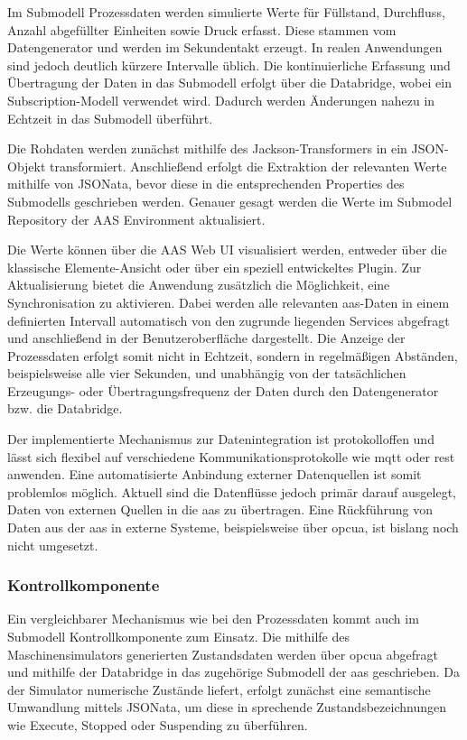 Im Submodell Prozessdaten werden simulierte Werte für Füllstand, Durchfluss, Anzahl abgefüllter Einheiten sowie Druck erfasst.
Diese stammen vom Datengenerator und werden im Sekundentakt erzeugt.
In realen Anwendungen sind jedoch deutlich kürzere Intervalle üblich.
Die kontinuierliche Erfassung und Übertragung der Daten in das Submodell erfolgt über die Databridge, wobei ein Subscription-Modell verwendet wird.
Dadurch werden Änderungen nahezu in Echtzeit in das Submodell überführt.

Die Rohdaten werden zunächst mithilfe des Jackson-Transformers in ein JSON-Objekt transformiert.
Anschließend erfolgt die Extraktion der relevanten Werte mithilfe von JSONata, bevor diese in die entsprechenden Properties des Submodells geschrieben werden.
Genauer gesagt werden die Werte im Submodel Repository der AAS Environment aktualisiert.

Die Werte können über die AAS Web UI visualisiert werden, entweder über die klassische Elemente-Ansicht oder über ein speziell entwickeltes Plugin.
Zur Aktualisierung bietet die Anwendung zusätzlich die Möglichkeit, eine Synchronisation zu aktivieren.
Dabei werden alle relevanten \acs{aas}-Daten in einem definierten Intervall automatisch von den zugrunde liegenden Services abgefragt und anschließend in der Benutzeroberfläche dargestellt.
Die Anzeige der Prozessdaten erfolgt somit nicht in Echtzeit, sondern in regelmäßigen Abständen, beispielsweise alle vier Sekunden, und unabhängig von der tatsächlichen Erzeugungs- oder Übertragungsfrequenz der Daten durch den Datengenerator bzw. die Databridge.


Der implementierte Mechanismus zur Datenintegration ist protokolloffen und lässt sich flexibel auf verschiedene Kommunikationsprotokolle wie \acs{mqtt} oder \acs{rest} anwenden.
Eine automatisierte Anbindung externer Datenquellen ist somit problemlos möglich.
Aktuell sind die Datenflüsse jedoch primär darauf ausgelegt, Daten von externen Quellen in die \acs{aas} zu übertragen.
Eine Rückführung von Daten aus der \acs{aas} in externe Systeme, beispielsweise über \acs{opcua}, ist bislang noch nicht umgesetzt.

\subsubsection*{Kontrollkomponente}
\vspace{-0.5em}
Ein vergleichbarer Mechanismus wie bei den Prozessdaten kommt auch im Submodell Kontrollkomponente zum Einsatz. 
Die mithilfe des Maschinensimulators generierten Zustandsdaten werden über \acs{opcua} abgefragt und mithilfe der Databridge in das zugehörige Submodell der \acs{aas} geschrieben. 
Da der Simulator numerische Zustände liefert, erfolgt zunächst eine semantische Umwandlung mittels JSONata, um diese in sprechende Zustandsbezeichnungen wie Execute, Stopped oder Suspending zu überführen.

